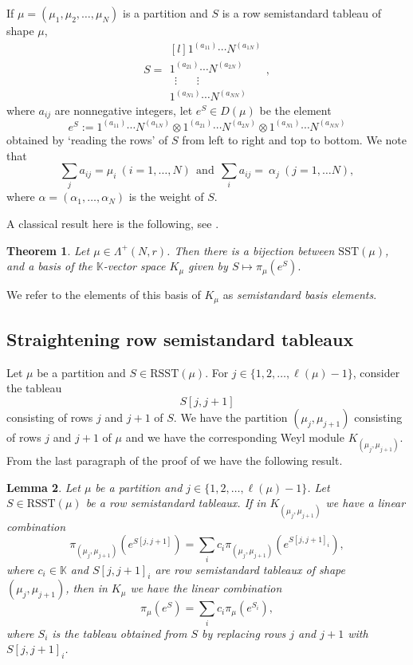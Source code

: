 \documentclass[11pt]{amsart}
\newtheorem{thm}{Theorem}[section]
\newtheorem{lem}[thm]{Lemma}
\theoremstyle{definition}
\numberwithin{equation}{section}
\begin{document}
If $\mu = (\mu_1, \mu_2, \dots, \mu_N)$ is a partition and $S$ is a row semistandard tableau of shape $\mu$,
\[ S=\begin{matrix*}[l]
	1^{(a_{11})} \cdots N^{(a_{1N})} \\
	1^{(a_{21})} \cdots N^{(a_{2N})} \\
	\ \ \vdots \ \ \ \ \ \ \ \ \vdots \\
	1^{(a_{N1})} \cdots N^{(a_{NN})} \end{matrix*},\]
where $a_{ij}$ are nonnegative integers, let $e^S \in D(\mu)$ be the element \[e^S:=1^{(a_{11})} \cdots N^{(a_{1N})}  \otimes 1^{(a_{21})} \cdots N^{(a_{2N})} \otimes 1^{(a_{N1})} \cdots N^{(a_{NN})}\] obtained by `reading the rows' of $S$ from left to right and top to bottom. We note that \[\sum_ja_{ij} = \mu_i \ (i=1, \dots, N) \ \ \mathrm{and} \ \ \sum_ia_{ij} = \ \alpha_j \ (j=1, \dots N), \]
where $\alpha = (\alpha_1, \dots, \alpha_N)$ is the weight of $S$.

A classical result here is the following, see \cite[(2.1.15) Proposition]{W}. \begin{thm}\label{sbthm} Let $\mu \in \Lambda^+(N,r)$. Then there is a bijection between $\mathrm{SST}(\mu)$, and a basis of the $\mathbb{K}$-vector space $K_{\mu}$ given by 
$ S \mapsto \pi_{\mu}(e^S).$\end{thm}
We refer to the elements of this basis of $K_\mu$ as \textit{semistandard basis elements}.
\subsection{Straightening row semistandard tableaux} Let $\mu$ be a partition and $S \in \mathrm{RSST}(\mu)$. For $j \in \{1,2,\dots, \ell(\mu)-1\}$, consider the tableau \[S[j,j+1]\] consisting of rows $j$ and $j+1$ of $S$. We have the partition $(\mu_j, \mu_{j+1})$ consisting of rows $j$ and $j+1$ of $\mu$ and we have the corresponding Weyl module $K_{(\mu_j,\mu_{j+1})}$. From the last paragraph of the proof of \cite[(2.1.15) Proposition]{W} we have the following result.
\begin{lem}\label{insertrows}
	Let $\mu$ be a partition and $j \in \{1,2,\dots, \ell(\mu)-1\}$.  Let $S \in \mathrm{RSST}(\mu)$ be a row semistandard tableaux. If in $K_{(\mu_j,\mu_{j+1})}$ we have a linear combination \[\pi_{(\mu_j,\mu_{j+1})}(e^{S[j,j+1]})=\sum_ic_i\pi_{(\mu_j,\mu_{j+1})}(e^{S[j,j+1]_i}),\] where $c_i \in \mathbb{K}$ and $S[j,j+1]_i$ are row semistandard tableaux of shape $(\mu_j,\mu_{j+1})$, then in $K_\mu$ we have the linear combination \[\pi_{\mu}(e^{S})=\sum_ic_i\pi_{\mu}(e^{S_i}),\] where $S_i$ is the tableau obtained from $S$ by replacing rows $j$ and $j+1$ with $S[j,j+1]_i$.
\end{lem}
\end{document}
